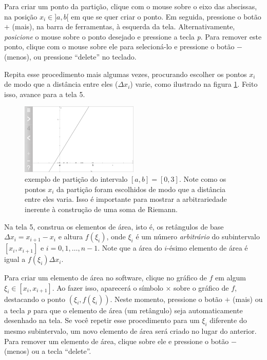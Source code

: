 \documentclass[a4paper,12pt]{scrartcl}
\begin{document}
\begin{list}{.}
      Para criar um ponto da partição, clique com o mouse sobre o eixo das abscissas, na posição $x_i \in ]a,b[$ em que se quer criar o ponto. Em seguida, pressione o botão $+$ (mais), na barra de ferramentas, à esquerda da tela. Alternativamente, \emph{posicione} o mouse sobre o ponto desejado e pressione a tecla \textit{p}. Para remover este ponto, clique com o mouse sobre ele para selecioná-lo e pressione o botão $-$ (menos), ou pressione ``delete'' no teclado.
      
      Repita esse procedimento mais algumas vezes, procurando escolher os pontos $x_i$ de modo que a distância entre eles ($\Delta x_i$) varie, como ilustrado na figura \ref{fig:particao}. Feito isso, avance para a tela 5.
      
      \begin{figure}
	\centering
	\includegraphics[width=0.5\textwidth]{particao.png}
	\caption{exemplo de partição do intervalo $[a,b] = [0,3]$. Note como os pontos $x_i$ da partição foram escolhidos de modo que a distância entre eles varia. Isso é importante para mostrar a arbitrariedade inerente à construção de uma soma de Riemann.}
	\label{fig:particao}
      \end{figure}

      \item Na tela 5, construa os elementos de área, isto é, os retângulos de base $\Delta x_i = x_{i+1} - x_i$ e altura $f(\xi_i)$, onde $\xi_i$ é um número \emph{arbitrário} do subintervalo $[x_i, x_{i+1}]$ e $i = 0,1,\ldots,n-1$. Note que a área do $i$-ésimo elemento de área é igual a $f(\xi_i)\Delta x_i$.
      
      Para criar um elemento de área no software, clique no gráfico de $f$ em algum $\xi_i \in [x_i,x_{i+1}]$. Ao fazer isso, aparecerá o símbolo $\times$ sobre o gráfico de $f$, destacando o ponto $\left(\xi_i, f(\xi_i)\right)$. Neste momento, pressione o botão $+$ (mais) ou a tecla \textit{p} para que o elemento de área (um retângulo) seja automaticamente desenhado na tela. Se você repetir esse procedimento para um $\xi_i$ diferente do mesmo subintervalo, um novo elemento de área será criado no lugar do anterior. Para remover um elemento de área, clique sobre ele e pressione o botão $-$ (menos) ou a tecla ``delete''.
      

\end{list}
\end{document}
